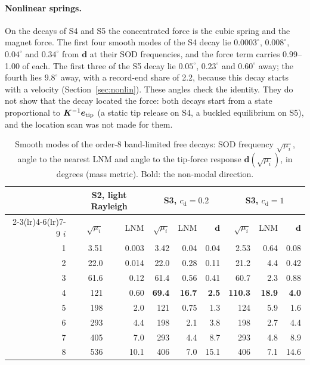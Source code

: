 \documentclass[preprint,12pt]{elsarticle}
\begin{document}
\paragraph{Nonlinear springs.} On the decays of S4 and S5 the concentrated force is the cubic spring and the magnet force. The first four smooth modes of the S4 decay lie $0.0003^\circ$, $0.008^\circ$, $0.04^\circ$ and $0.34^\circ$ from $\bm{d}$ at their SOD frequencies, and the force term carries 0.99--1.00 of each. The first three of the S5 decay lie $0.05^\circ$, $0.23^\circ$ and $0.60^\circ$ away; the fourth lies $9.8^\circ$ away, with a record-end share of 2.2, because this decay starts with a velocity (Section~\ref{sec:nonlin}). These angles check the identity. They do not show that the decay located the force: both decays start from a state proportional to $\bm{K}^{-1}\bm{e}_{\mathrm{tip}}$ (a static tip release on S4, a buckled equilibrium on S5), and the location scan was not made for them.

\begin{table}[tbp]
\centering\small
\caption{Smooth modes of the order-8 band-limited free decays: SOD frequency $\sqrt{\mu_i}$, angle to the nearest LNM and angle to the tip-force response $\bm{d}(\sqrt{\mu_i})$, in degrees (mass metric). Bold: the non-modal direction.}
\label{tab:angles}
\begin{tabular}{rrrrrrrrr}
\toprule
 & \multicolumn{2}{c}{S2, light Rayleigh} & \multicolumn{3}{c}{S3, $c_{\mathrm d}=0.2$} & \multicolumn{3}{c}{S3, $c_{\mathrm d}=1$}\\
\cmidrule(lr){2-3}\cmidrule(lr){4-6}\cmidrule(lr){7-9}
$i$ & $\sqrt{\mu_i}$ & LNM & $\sqrt{\mu_i}$ & LNM & $\bm{d}$ & $\sqrt{\mu_i}$ & LNM & $\bm{d}$\\ \midrule
1 & 3.51 & 0.003 & 3.42 & 0.04 & 0.04 & 2.53 & 0.64 & 0.08\\
2 & 22.0 & 0.014 & 22.0 & 0.28 & 0.11 & 21.2 & 4.4 & 0.42\\
3 & 61.6 & 0.12 & 61.4 & 0.56 & 0.41 & 60.7 & 2.3 & 0.88\\
4 & 121 & 0.60 & \textbf{69.4} & \textbf{16.7} & \textbf{2.5} & \textbf{110.3} & \textbf{18.9} & \textbf{4.0}\\
5 & 198 & 2.0 & 121 & 0.75 & 1.3 & 124 & 5.9 & 1.6\\
6 & 293 & 4.4 & 198 & 2.1 & 3.8 & 198 & 2.7 & 4.4\\
7 & 405 & 7.0 & 293 & 4.4 & 8.7 & 293 & 4.8 & 8.9\\
8 & 536 & 10.1 & 406 & 7.0 & 15.1 & 406 & 7.1 & 14.6\\
\bottomrule
\end{tabular}
\end{table}
\end{document}
